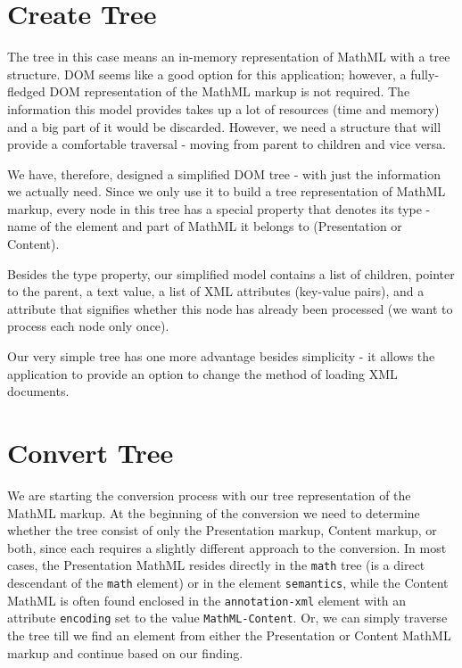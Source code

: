 \documentclass[11pt,oneside,final]{fithesis2}
\begin{document}
\section{Create Tree}
\label{section:createtree}
The tree in this case means an in-memory representation of MathML with a tree structure. DOM seems like a good option for this application; however, a fully-fledged DOM representation of the MathML markup is not required. The information this model provides takes up a lot of resources (time and memory) and a big part of it would be discarded. However, we need a structure that will provide a comfortable traversal - moving from parent to children and vice versa.

We have, therefore, designed a simplified DOM tree - with just the information we actually need. Since we only use it to build a tree representation of MathML markup, every node in this tree has a special property that denotes its type - name of the element and part of MathML it belongs to (Presentation or Content). 

Besides the type property, our simplified model contains a list of children, pointer to the parent, a text value, a list of XML attributes (key-value pairs), and a attribute that signifies whether this node has already been processed (we want to process each node only once).

Our very simple tree has one more advantage besides simplicity - it allows the application to provide an option to change the method of loading XML documents.

\section{Convert Tree}
We are starting the conversion process with our tree representation of the MathML markup. At the beginning of the conversion we need to determine whether the tree consist of only the Presentation markup, Content markup, or both, since each requires a slightly different approach to the conversion. In most cases, the Presentation MathML resides directly in the \texttt{math} tree (is a direct descendant of the \texttt{math} element) or in the element \texttt{semantics}, while the Content MathML is often found enclosed in the \texttt{annotation-xml} element with an attribute \texttt{encoding} set to the value \texttt{MathML-Content}. Or, we can simply traverse the tree till we find an element from either the Presentation or Content MathML markup and continue based on our finding.
\end{document}
